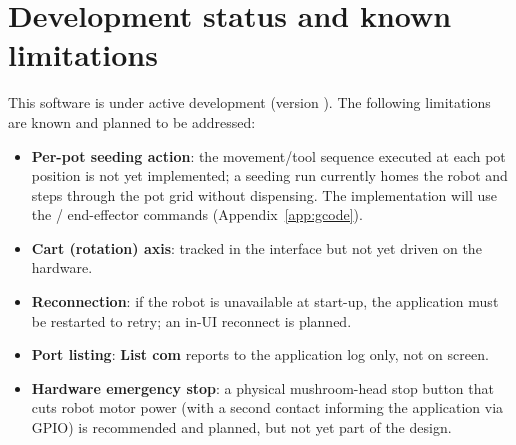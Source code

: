 \chapter{Development status and known limitations}
\label{app:limitations}

This software is under active development (version \appversion). The following
limitations are known and planned to be addressed:

\begin{itemize}[itemsep=3pt]
  \item \textbf{Per-pot seeding action}: the movement/tool sequence executed at each
        pot position is not yet implemented; a seeding run currently homes the robot
        and steps through the pot grid without dispensing. The implementation will
        use the / end-effector commands
        (Appendix~\ref{app:gcode}).
  \item \textbf{Cart (rotation) axis}: tracked in the interface but not yet driven
        on the hardware.
  \item \textbf{Reconnection}: if the robot is unavailable at start-up, the
        application must be restarted to retry; an in-UI reconnect is planned.
  \item \textbf{Port listing}: \textbf{List com} reports to the application log
        only, not on screen.
  \item \textbf{Hardware emergency stop}: a physical mushroom-head stop button that
        cuts robot motor power (with a second contact informing the application via
        GPIO) is recommended and planned, but not yet part of the design.
\end{itemize}
